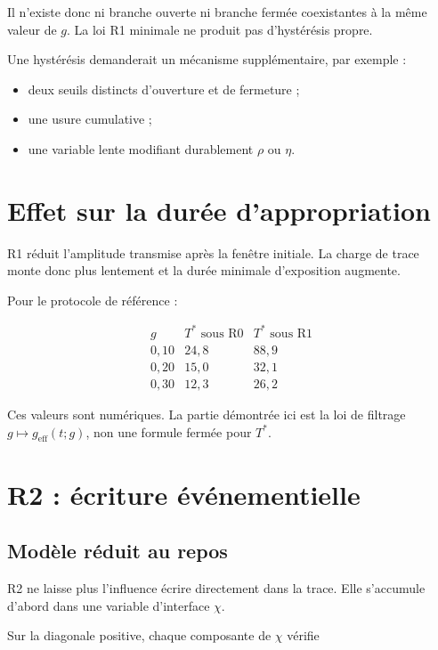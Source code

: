 Il n'existe donc ni branche ouverte ni branche fermée coexistantes à
la même valeur de \(g\). La loi R1 minimale ne produit pas
d'hystérésis propre.

Une hystérésis demanderait un mécanisme supplémentaire, par exemple :

\begin{itemize}
\item
  deux seuils distincts d'ouverture et de fermeture ;
\item
  une usure cumulative ;
\item
  une variable lente modifiant durablement \(\rho\) ou \(\eta\).
\end{itemize}

\section{Effet sur la durée d'appropriation}
\label{annexe-r1-duree}

R1 réduit l'amplitude transmise après la fenêtre initiale. La charge de
trace monte donc plus lentement et la durée minimale d'exposition
augmente.

Pour le protocole de référence :

\[
\begin{array}{c|cc}
g
&
T^\ast\text{ sous R0}
&
T^\ast\text{ sous R1}
\\
\hline
0{,}10&24{,}8&88{,}9\\
0{,}20&15{,}0&32{,}1\\
0{,}30&12{,}3&26{,}2
\end{array}
\]

Ces valeurs sont numériques. La partie démontrée ici est la loi de
filtrage \(g\mapsto g_{\mathrm{eff}}(t;g)\), non une formule fermée
pour \(T^\ast\).

\section{R2 : écriture événementielle}

\subsection{Modèle réduit au repos}
\label{annexe-r2-modele}

R2 ne laisse plus l'influence écrire directement dans la trace. Elle
s'accumule d'abord dans une variable d'interface \(\chi\).

Sur la diagonale positive, chaque composante de \(\chi\) vérifie

